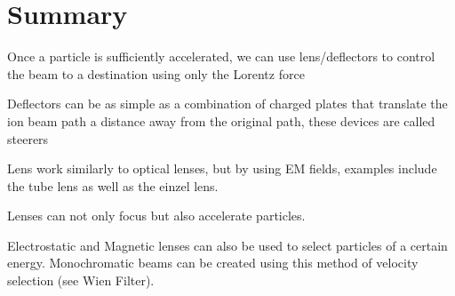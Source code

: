 \section{Summary}

\begin{myitemize}
	\item Once a particle is sufficiently accelerated, we can use lens/deflectors to control the beam to a destination using only the Lorentz force
	\item Deflectors can be as simple as a combination of charged plates that translate the ion beam path a distance away from the original path, these devices are called steerers
	\item Lens work similarly to optical lenses, but by using EM fields, examples include the tube lens as well as the einzel lens.
	\item Lenses can not only focus but also accelerate particles.
	\item Electrostatic and Magnetic lenses can also be used to select particles of a certain energy.
    Monochromatic beams can be created using this method of velocity selection (see Wien Filter).
\end{myitemize}